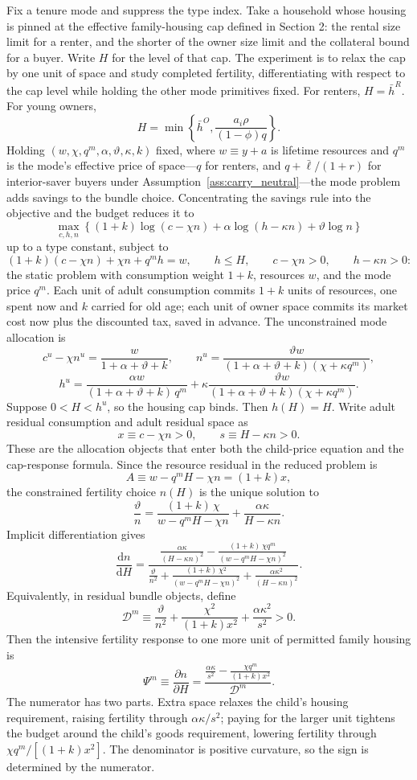 \documentclass[11pt]{article}
\newcommand{\dd}{\mathrm d}
\newcommand{\1}{\mathbf 1}
\begin{document}
Fix a tenure mode and suppress the type index. Take a household whose housing is pinned at the effective family-housing cap defined in Section 2: the rental size limit for a renter, and the shorter of the owner size limit and the collateral bound for a buyer. Write $H$ for the level of that cap. The experiment is to relax the cap by one unit of space and study completed fertility, differentiating with respect to the cap level while holding the other mode primitives fixed. For renters, $H=\bar h^R$. For young owners,
\[
H=
\min\left\{
\bar h^O,
\frac{a_i\rho}{(1-\phi)q}
\right\}.
\]
Holding $(w,\chi,q^m,\alpha,\vartheta,\kappa,k)$ fixed, where $w\equiv y+a$ is lifetime resources and $q^m$ is the mode's effective price of space---$q$ for renters, and $q+\bar\ell/(1+r)$ for interior-saver buyers under Assumption~\ref{ass:carry_neutral}---the mode problem adds savings to the bundle choice. Concentrating the savings rule into the objective and the budget reduces it to
\[
\max_{c,h,n}
\left\{
(1+k)\log(c-\chi n)+\alpha\log(h-\kappa n)+\vartheta\log n
\right\}
\]
up to a type constant, subject to
\[
(1+k)(c-\chi n)+\chi n+q^m h=w,
\qquad
h\le H,
\qquad
c-\chi n>0,
\qquad
h-\kappa n>0:
\]
the static problem with consumption weight $1+k$, resources $w$, and the mode price $q^m$. Each unit of adult consumption commits $1+k$ units of resources, one spent now and $k$ carried for old age; each unit of owner space commits its market cost now plus the discounted tax, saved in advance.
The unconstrained mode allocation is
\[
c^u-\chi n^u=\frac{w}{1+\alpha+\vartheta+k},
\qquad
n^u=
\frac{\vartheta w}{(1+\alpha+\vartheta+k)(\chi+\kappa q^m)},
\]
\[
h^u=
\frac{\alpha w}{(1+\alpha+\vartheta+k)\,q^m}
+
\kappa
\frac{\vartheta w}{(1+\alpha+\vartheta+k)(\chi+\kappa q^m)}.
\]
Suppose $0<H<h^u$, so the housing cap binds. Then $h(H)=H$. Write adult residual consumption and adult residual space as
\[
x\equiv c-\chi n>0,
\qquad
s\equiv H-\kappa n>0.
\]
These are the allocation objects that enter both the child-price equation and the cap-response formula. Since the resource residual in the reduced problem is
\[
A\equiv w-q^mH-\chi n=(1+k)x,
\]
the constrained fertility choice $n(H)$ is the unique solution to
\[
\frac{\vartheta}{n}
=
\frac{(1+k)\,\chi}{w-q^m H-\chi n}
+
\frac{\alpha\kappa}{H-\kappa n}.
\]
Implicit differentiation gives
\[
\frac{\dd n}{\dd H}
=
\frac{
\frac{\alpha\kappa}{(H-\kappa n)^2}
-
\frac{(1+k)\,\chi q^m}{(w-q^m H-\chi n)^2}
}{
\frac{\vartheta}{n^2}
+
\frac{(1+k)\,\chi^2}{(w-q^m H-\chi n)^2}
+
\frac{\alpha\kappa^2}{(H-\kappa n)^2}
}.
\]
Equivalently, in residual bundle objects, define
\[
\mathcal D^m
\equiv
\frac{\vartheta}{n^2}
+
\frac{\chi^2}{(1+k)x^2}
+
\frac{\alpha\kappa^2}{s^2}>0.
\]
Then the intensive fertility response to one more unit of permitted family housing is
\[
\Psi^m
\equiv
\frac{\partial n}{\partial H}
=
\frac{
\frac{\alpha\kappa}{s^2}
-
\frac{\chi q^m}{(1+k)x^2}
}{
\mathcal D^m
}.
\]
The numerator has two parts. Extra space relaxes the child's housing requirement, raising fertility through $\alpha\kappa/s^2$; paying for the larger unit tightens the budget around the child's goods requirement, lowering fertility through $\chi q^m/[(1+k)x^2]$. The denominator is positive curvature, so the sign is determined by the numerator.
\end{document}
